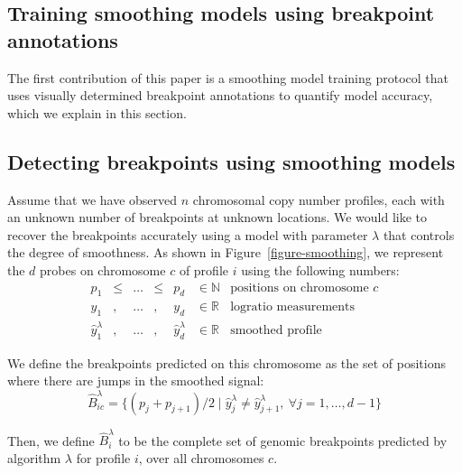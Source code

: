 \documentclass{bioinfo}
\newcommand{\NA}{\texttt{NA}}
\newcommand{\RR}{\mathbb R}
\newcommand{\NN}{\mathbb N}
\begin{document}
\begin{methods}
\section{Training smoothing models using breakpoint annotations}
\label{training}
The first contribution of this paper is a smoothing model training
protocol that uses visually determined breakpoint annotations to
quantify model accuracy, which we explain in this section.

\subsection{Detecting breakpoints using smoothing models}

Assume that we have observed $n$ chromosomal copy number profiles,
each with an unknown number of breakpoints at unknown locations. We
would like to recover the breakpoints accurately using a model with
parameter $\lambda$ that controls the degree of smoothness. As shown
in Figure~\ref{figure-smoothing}, we represent the $d$ probes on
chromosome $c$ of profile $i$ using the following numbers:
\begin{equation*}
  \label{eq:def}
  \begin{array}{ccccccl}
    p_1 & \leq & \dots & \leq & p_{d} &\in\NN&
    \text{positions on chromosome $c$}\\
    y_1 & , & \dots & , & y_{d} & \in\RR&
    \text{logratio measurements}\\
    \hat y_1^\lambda & , & \dots & , & \hat y_{d}^\lambda &\in\RR&
    \text{smoothed profile}
  \end{array}
\end{equation*}



We define the breakpoints predicted on this chromosome as the set of
positions where there are jumps in the smoothed signal:
\begin{equation}
  \label{eq:predicted}
  \hat B^\lambda_{ic} = \big\{
(p_j+p_{j+1})/2
\mid
\hat y_{j}^\lambda\neq
\hat y_{j+1}^\lambda,
\ \forall j=1,\dots,d-1
\big\}
\end{equation}

Then, we define $\hat B_i^\lambda$ to be the complete set of genomic
breakpoints predicted by algorithm $\lambda$ for profile $i$, over all
chromosomes $c$.




\end{methods}
\end{document}
